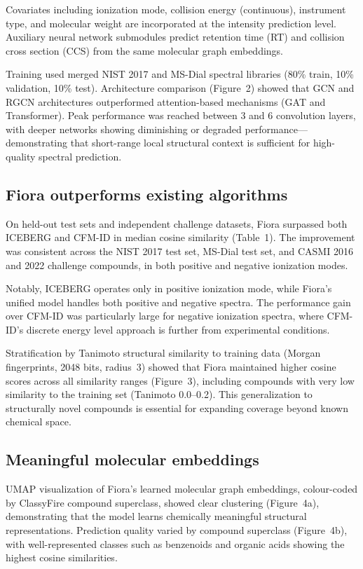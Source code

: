 \documentclass[11pt]{article}
\begin{document}
Covariates including ionization mode, collision energy (continuous), instrument type, and molecular weight are incorporated at the intensity prediction level. Auxiliary neural network submodules predict retention time (RT) and collision cross section (CCS) from the same molecular graph embeddings.

Training used merged NIST 2017 and MS-Dial spectral libraries (80\% train, 10\% validation, 10\% test). Architecture comparison (Figure~2) showed that GCN and RGCN architectures outperformed attention-based mechanisms (GAT and Transformer). Peak performance was reached between 3 and 6 convolution layers, with deeper networks showing diminishing or degraded performance---demonstrating that short-range local structural context is sufficient for high-quality spectral prediction.

\subsection{Fiora outperforms existing algorithms}

On held-out test sets and independent challenge datasets, Fiora surpassed both ICEBERG and CFM-ID in median cosine similarity (Table~1). The improvement was consistent across the NIST 2017 test set, MS-Dial test set, and CASMI 2016 and 2022 challenge compounds, in both positive and negative ionization modes.

Notably, ICEBERG operates only in positive ionization mode, while Fiora's unified model handles both positive and negative spectra. The performance gain over CFM-ID was particularly large for negative ionization spectra, where CFM-ID's discrete energy level approach is further from experimental conditions.

Stratification by Tanimoto structural similarity to training data (Morgan fingerprints, 2048 bits, radius~3) showed that Fiora maintained higher cosine scores across all similarity ranges (Figure~3), including compounds with very low similarity to the training set (Tanimoto 0.0--0.2). This generalization to structurally novel compounds is essential for expanding coverage beyond known chemical space.

\subsection{Meaningful molecular embeddings}

UMAP visualization of Fiora's learned molecular graph embeddings, colour-coded by ClassyFire compound superclass, showed clear clustering (Figure~4a), demonstrating that the model learns chemically meaningful structural representations. Prediction quality varied by compound superclass (Figure~4b), with well-represented classes such as benzenoids and organic acids showing the highest cosine similarities.
\end{document}
